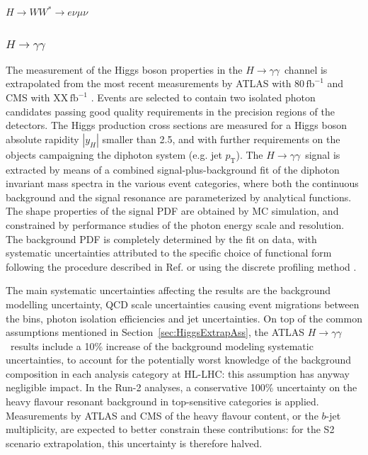 \newcommand{\Hyy}{\hbox{$H\to\gamma\gamma$}}
\newcommand{\HZy}{\hbox{$H \to Z\gamma$}}
\newcommand{\HZZ}{\hbox{$H \to ZZ^* \to 4\ell$}}
\newcommand{\HWW}{\hbox{$H \to WW^* \to e \nu \mu \nu$}}

\HWW\subsubsection{$H \to \gamma\gamma$}
\label{sec:Hgammagamma}

The measurement of the Higgs boson properties in the \Hyy\ channel is extrapolated from the most recent measurements by ATLAS with 80\,$\mathrm{fb}^{-1}$ \cite{ATLAS:2018uso} and CMS with XX\,$\mathrm{fb}^{-1}$ \cite{}.
Events are selected to contain two isolated photon candidates passing good quality requirements in the precision regions of the detectors.
The Higgs production cross sections are measured for a Higgs boson absolute rapidity $|y_H|$ smaller than 2.5, and with further requirements on the objects campaigning the diphoton system (e.g. jet $p_\mathrm{T}$).
The \Hyy\ signal is extracted by means of a combined signal-plus-background fit of the diphoton invariant mass spectra in the various event categories, where both the continuous background and the signal resonance are parameterized by analytical functions. The shape properties of the signal PDF are obtained by MC simulation, and constrained by performance studies of the photon energy scale and resolution. The background PDF is completely determined by the fit on data, with systematic uncertainties attributed to the specific choice of functional form following the procedure described in Ref. \cite{Aad:2012tfa} or using the discrete profiling method \cite{Dauncey:2014xga}.

The main systematic uncertainties affecting the results are the background modelling uncertainty, QCD scale uncertainties causing event migrations between the bins, photon isolation efficiencies and jet uncertainties.
%
On top of the common assumptions mentioned in Section~\ref{sec:HiggsExtrapAss}, the ATLAS \Hyy\ results include a 10\% increase of the background modeling systematic uncertainties, to account for the potentially worst knowledge of the background composition in each analysis category at HL-LHC: this assumption has anyway negligible impact.
%
In the Run-2 analyses, a conservative 100\% uncertainty on the heavy flavour resonant background in top-sensitive categories is applied. Measurements by ATLAS and CMS of the heavy flavour content, or the $b$-jet multiplicity, are expected to better constrain these contributions: for the S2 scenario extrapolation, this uncertainty is therefore halved.

